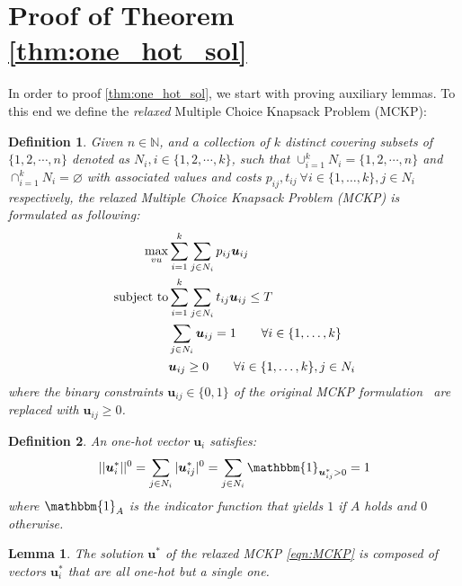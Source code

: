 \documentclass[dvipsnames,table,xcdraw]{article}
\newtheorem{de}{Definition}[section]
\newtheorem{lem}[theo]{Lemma}
\newcommand{\mb}[1]{{\boldsymbol{#1}}}
\newcommand{\vu}{\mb{u}}
\begin{document}
\vspace{-3mm}
\section{Proof of Theorem \ref{thm:one_hot_sol}}
In order to proof \ref{thm:one_hot_sol}, we start with proving auxiliary lemmas. To this end we define the \textit{relaxed} Multiple Choice Knapsack Problem (MCKP):

\begin{de}
Given $n\in\mathbb{N}$, and a collection of $k$ distinct covering subsets of $\{1,2,\cdots, n\}$ denoted as $N_i,i\in\{1,2,\cdots,k\}$, such that $\cup_{i=1}^k N_i=\{1,2,\cdots, n\}$ and $\cap_{i=1}^k N_i=\varnothing$ with 
associated values and costs $p_{ij}, t_{ij}~ \forall i \in \{1,\dots,k\}, j \in N_i$ respectively, the relaxed Multiple Choice Knapsack Problem (MCKP) is formulated as following:
\vspace{-3mm}
\begin{align}
\label{eqn:MCKP}
\notag
\max_{vu} &\sum_{i=1}^k \sum_{j\in N_i}  p_{ij} \vu_{ij} \\
\text{subject to}
&\sum_{i=1}^k\sum_{j\in N_i} t_{ij} \vu_{ij} \leq T \\
\notag
&\sum_{j \in N_i}\vu_{ij} = 1 \qquad \forall i \in \{1,\dots,k\} \\
\notag
&\vu_{ij} \geq 0  \qquad \forall i \in \{1,\dots,k\}, j \in N_i
\end{align}
where the binary constraints $\displaystyle{\vu_{ij}\in \{0,1\}}$ of the original MCKP formulation~\cite{MCKP} are replaced with $\displaystyle{\vu_{ij} \geq 0}$.
\end{de}

\begin{de}
 An one-hot vector $\vu_i$ satisfies: $$||\vu_i^*||^0=\sum_{j\in N_i} |\vu_{ij}^*|^0=\sum_{j\in N_i}\mathbbm{1}_{\vu_{ij}^*>0}=1$$ 
where $\mathbbm{1}_A$ is the indicator function that yields $1$ if $A$ holds and $0$ otherwise.
\end{de}

\begin{lem}\label{lem:single_non_one_hot}
The solution $\vu^*$ of the \textit{relaxed} MCKP \eqref{eqn:MCKP} is composed of vectors $\vu_i^*$ that are all one-hot but a single one. 
\end{lem}
\end{document}
